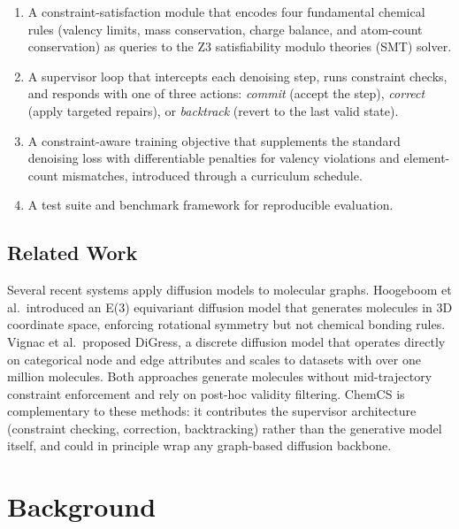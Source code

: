 \documentclass[11pt]{article}
\begin{document}
\begin{enumerate}[nosep]
  \item A constraint-satisfaction module that encodes four fundamental
        chemical rules (valency limits, mass conservation, charge
        balance, and atom-count conservation) as queries to the Z3
        satisfiability modulo theories (SMT) solver.
  \item A supervisor loop that intercepts each denoising step, runs
        constraint checks, and responds with one of three actions:
        \emph{commit} (accept the step), \emph{correct} (apply targeted
        repairs), or \emph{backtrack} (revert to the last valid state).
  \item A constraint-aware training objective that supplements the
        standard denoising loss with differentiable penalties for valency
        violations and element-count mismatches, introduced through a
        curriculum schedule.
  \item A test suite and benchmark framework for reproducible
        evaluation.
\end{enumerate}

\subsection*{Related Work}

Several recent systems apply diffusion models to molecular graphs.
Hoogeboom et al.\ introduced an E(3)
equivariant diffusion model that generates molecules in 3D coordinate
space, enforcing rotational symmetry but not chemical bonding rules.
Vignac et al.\ proposed DiGress, a discrete
diffusion model that operates directly on categorical node and edge
attributes and scales to datasets with over one million molecules.
Both approaches generate molecules without mid-trajectory constraint
enforcement and rely on post-hoc validity filtering. ChemCS is
complementary to these methods: it contributes the supervisor
architecture (constraint checking, correction, backtracking) rather
than the generative model itself, and could in principle wrap any
graph-based diffusion backbone.

\section{Background}
\end{document}
